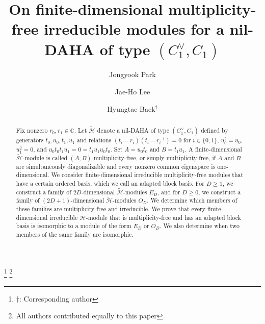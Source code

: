 \documentclass[reqno]{amsart}
\theoremstyle{definition}
\begin{document}
\title[Multiplicity-free modules for a nil-DAHA]
{On finite-dimensional multiplicity-free irreducible modules for a nil-DAHA of type $(C_1^\vee,C_1)$}

\author[J. Park]{Jongyook Park}
\address{(Park) Department of Mathematics,
College of Natural Sciences,
Kyungpook National University, Daegu 41566,
Republic of Korea}

\author[J.-H. Lee]{Jae-Ho Lee}
\address{(Lee) Department of Mathematics and Statistics,
University of North Florida,
Jacksonville, FL 32224, USA}

\author[H. Baek]{Hyungtae Baek$^{\dag}$}
\address{(Baek) School of Mathematics,
Kyungpook National University, Daegu 41566,
Republic of Korea}

\thanks{$\dag$: Corresponding author}
\thanks{All authors contributed equally to this paper}



\begin{abstract}
Fix nonzero $r_0,r_1\in\mathbb{C}$.
Let $\widetilde{\mathcal H}$ denote a nil-DAHA of type
$(C_1^\vee,C_1)$ defined by generators $t_0,u_0,t_1,u_1$ and relations
$(t_i-r_i)(t_i-r_i^{-1})=0$ for $i\in\{0,1\}$,
$u_0^2=u_0$, $u_1^2=0$, and
$u_0t_0t_1u_1=0=t_1u_1u_0t_0$.
Set $A=u_0t_0$ and $B=t_1u_1$.
A finite-dimensional $\widetilde{\mathcal H}$-module is called
$(A,B)$-multiplicity-free, or simply multiplicity-free, if $A$ and $B$
are simultaneously diagonalizable and every nonzero common eigenspace
is one-dimensional.
We consider finite-dimensional irreducible multiplicity-free modules that
have a certain ordered basis, which we call an adapted block basis.
For $D\geq 1$, we construct a family of $2D$-dimensional
$\widetilde{\mathcal H}$-modules $E_D$, and for $D\geq 0$, we construct
a family of $(2D+1)$-dimensional $\widetilde{\mathcal H}$-modules $O_D$.
We determine which members of these families are multiplicity-free and
irreducible.
We prove that every finite-dimensional irreducible
$\widetilde{\mathcal H}$-module that is multiplicity-free and has an
adapted block basis is isomorphic to a module of the form $E_D$ or $O_D$.
We also determine when two members of the same family are
isomorphic.
\end{abstract}




\maketitle
\end{document}
